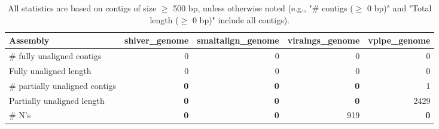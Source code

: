 \documentclass[12pt,a4paper]{article}
\begin{document}
\begin{table}[ht]
\begin{center}
\caption{All statistics are based on contigs of size $\geq$ 500 bp, unless otherwise noted (e.g., "\# contigs ($\geq$ 0 bp)" and "Total length ($\geq$ 0 bp)" include all contigs).}
\begin{tabular}{|l*{4}{|r}|}
\hline
Assembly & shiver\_genome & smaltalign\_genome & viralngs\_genome & vpipe\_genome \\ \hline
\# fully unaligned contigs & 0 & 0 & 0 & 0 \\ \hline
Fully unaligned length & 0 & 0 & 0 & 0 \\ \hline
\# partially unaligned contigs & {\bf 0} & {\bf 0} & {\bf 0} & 1 \\ \hline
Partially unaligned length & {\bf 0} & {\bf 0} & {\bf 0} & 2429 \\ \hline
\# N's & {\bf 0} & {\bf 0} & 919 & {\bf 0} \\ \hline
\end{tabular}
\end{center}
\end{table}
\end{document}
